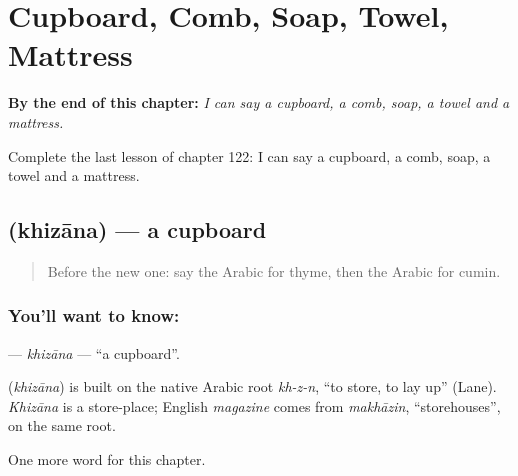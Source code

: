 
\chapter{Cupboard, Comb, Soap, Towel, Mattress}
\label{ch:ar-cupboard-comb-soap-towel-mattress}

\begin{chapteropening}
\textbf{By the end of this chapter:} \emph{I can say a cupboard, a comb, soap, a towel and a mattress.}

Complete the last lesson of chapter 122: I can say a cupboard, a comb, soap, a towel and a mattress.
\end{chapteropening}

\section[\texorpdfstring{\ar{خزانة} (khizāna)}{خزانة (khizāna)}]{ (khizāna) — a cupboard}

\label{lesson:AR-C122-khizana}



\begin{quote}
Before the new one: say the Arabic for thyme, then the Arabic for cumin.
\end{quote}

\subsection*{You'll want to know: }
\textbf{} — \emph{khizāna} — \textquotedblleft{}a cupboard\textquotedblright{}.

\begin{cousinweb}
\textbf{} (\emph{khizāna}) is built on the native Arabic root \emph{kh-z-n}, \textquotedblleft{}to store, to lay up\textquotedblright{} (Lane). \emph{Khizāna} is a store-place; English \emph{magazine} comes from \emph{makhāzin}, \textquotedblleft{}storehouses\textquotedblright{}, on the same root.
\end{cousinweb}

\begin{grammarlens}[title={What you've built}]
One more word for this chapter.
\end{grammarlens}

